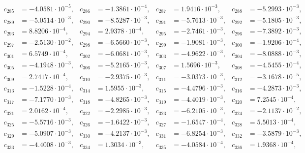 \begin{align*}
c_{ 285 } &= -4.0581 \cdot 10^{ -5 }, & c_{ 286 } &= -1.3861 \cdot 10^{ -4 }, & c_{ 287 } &= 1.9416 \cdot 10^{ -3 }, & c_{ 288 } &= -5.2993 \cdot 10^{ -3 },\\ 
c_{ 289 } &= -5.0514 \cdot 10^{ -3 }, & c_{ 290 } &= -8.5287 \cdot 10^{ -3 }, & c_{ 291 } &= -5.7613 \cdot 10^{ -3 }, & c_{ 292 } &= -5.1805 \cdot 10^{ -3 },\\ 
c_{ 293 } &= 8.8206 \cdot 10^{ -4 }, & c_{ 294 } &= 2.9378 \cdot 10^{ -4 }, & c_{ 295 } &= -2.7461 \cdot 10^{ -3 }, & c_{ 296 } &= -7.3892 \cdot 10^{ -3 },\\ 
c_{ 297 } &= -2.5130 \cdot 10^{ -2 }, & c_{ 298 } &= -6.5660 \cdot 10^{ -3 }, & c_{ 299 } &= -1.9081 \cdot 10^{ -3 }, & c_{ 300 } &= -1.9206 \cdot 10^{ -4 },\\ 
c_{ 301 } &= 6.5749 \cdot 10^{ -4 }, & c_{ 302 } &= -6.0681 \cdot 10^{ -3 }, & c_{ 303 } &= -4.9622 \cdot 10^{ -3 }, & c_{ 304 } &= -8.0888 \cdot 10^{ -3 },\\ 
c_{ 305 } &= -4.1948 \cdot 10^{ -3 }, & c_{ 306 } &= -5.2165 \cdot 10^{ -3 }, & c_{ 307 } &= 1.5696 \cdot 10^{ -3 }, & c_{ 308 } &= -4.5455 \cdot 10^{ -4 },\\ 
c_{ 309 } &= 2.7417 \cdot 10^{ -4 }, & c_{ 310 } &= -2.9375 \cdot 10^{ -3 }, & c_{ 311 } &= -3.0373 \cdot 10^{ -3 }, & c_{ 312 } &= -3.1678 \cdot 10^{ -5 },\\ 
c_{ 313 } &= -1.5228 \cdot 10^{ -4 }, & c_{ 314 } &= 1.5955 \cdot 10^{ -3 }, & c_{ 315 } &= -4.4796 \cdot 10^{ -3 }, & c_{ 316 } &= -4.2873 \cdot 10^{ -3 },\\ 
c_{ 317 } &= -7.1770 \cdot 10^{ -3 }, & c_{ 318 } &= -4.8265 \cdot 10^{ -3 }, & c_{ 319 } &= -4.4019 \cdot 10^{ -3 }, & c_{ 320 } &= 7.2545 \cdot 10^{ -4 },\\ 
c_{ 321 } &= 2.0162 \cdot 10^{ -4 }, & c_{ 322 } &= -2.2985 \cdot 10^{ -3 }, & c_{ 323 } &= -6.2105 \cdot 10^{ -3 }, & c_{ 324 } &= -2.1137 \cdot 10^{ -2 },\\ 
c_{ 325 } &= -5.5716 \cdot 10^{ -3 }, & c_{ 326 } &= -1.6422 \cdot 10^{ -3 }, & c_{ 327 } &= -1.6547 \cdot 10^{ -4 }, & c_{ 328 } &= 5.5013 \cdot 10^{ -4 },\\ 
c_{ 329 } &= -5.0907 \cdot 10^{ -3 }, & c_{ 330 } &= -4.2137 \cdot 10^{ -3 }, & c_{ 331 } &= -6.8254 \cdot 10^{ -3 }, & c_{ 332 } &= -3.5879 \cdot 10^{ -3 },\\ 
c_{ 333 } &= -4.4008 \cdot 10^{ -3 }, & c_{ 334 } &= 1.3034 \cdot 10^{ -3 }, & c_{ 335 } &= -4.0584 \cdot 10^{ -4 }, & c_{ 336 } &= 1.9368 \cdot 10^{ -4 },\\ 

\end{align*}
